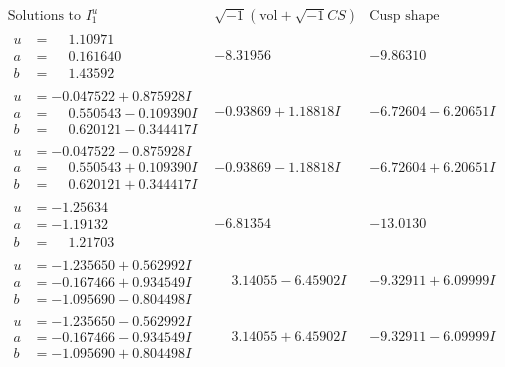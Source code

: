 \documentclass[1p]{elsarticle_modified}
\theoremstyle{definition}
\newcommand{\I}{\sqrt{-1}}
\begin{document}
$$\begin{array}{c|c|c}  
\text{Solutions to }I^u_{1}& \I (\text{vol} + \sqrt{-1}CS) & \text{Cusp shape}\\
 \hline 
\begin{aligned}
u &= \phantom{-}1.10971\phantom{ +0.000000I} \\
a &= \phantom{-}0.161640\phantom{ +0.000000I} \\
b &= \phantom{-}1.43592\phantom{ +0.000000I}\end{aligned}
 & -8.31956\phantom{ +0.000000I} & -9.86310\phantom{ +0.000000I} \\ \hline\begin{aligned}
u &= -0.047522 + 0.875928 I \\
a &= \phantom{-}0.550543 - 0.109390 I \\
b &= \phantom{-}0.620121 - 0.344417 I\end{aligned}
 & -0.93869 + 1.18818 I & -6.72604 - 6.20651 I \\ \hline\begin{aligned}
u &= -0.047522 - 0.875928 I \\
a &= \phantom{-}0.550543 + 0.109390 I \\
b &= \phantom{-}0.620121 + 0.344417 I\end{aligned}
 & -0.93869 - 1.18818 I & -6.72604 + 6.20651 I \\ \hline\begin{aligned}
u &= -1.25634\phantom{ +0.000000I} \\
a &= -1.19132\phantom{ +0.000000I} \\
b &= \phantom{-}1.21703\phantom{ +0.000000I}\end{aligned}
 & -6.81354\phantom{ +0.000000I} & -13.0130\phantom{ +0.000000I} \\ \hline\begin{aligned}
u &= -1.235650 + 0.562992 I \\
a &= -0.167466 + 0.934549 I \\
b &= -1.095690 - 0.804498 I\end{aligned}
 & \phantom{-}3.14055 - 6.45902 I & -9.32911 + 6.09999 I \\ \hline\begin{aligned}
u &= -1.235650 - 0.562992 I \\
a &= -0.167466 - 0.934549 I \\
b &= -1.095690 + 0.804498 I\end{aligned}
 & \phantom{-}3.14055 + 6.45902 I & -9.32911 - 6.09999 I \\ \hline\begin{aligned}

\end{aligned}
\end{array}$$
\end{document}
